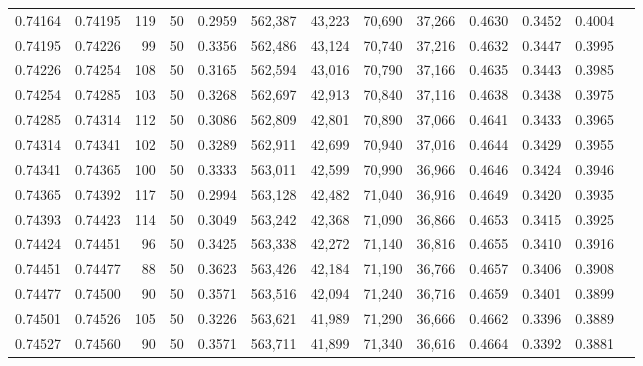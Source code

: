 \begin{tabular}{rrrrrrrrrrrrr}
0.74164 & 0.74195 &   119 &  50 &                                     0.2959 & 562,387 &  43,223 &  70,690 &  37,266 & 0.4630 & 0.3452 & 0.4004 \\
0.74195 & 0.74226 &    99 &  50 &                                     0.3356 & 562,486 &  43,124 &  70,740 &  37,216 & 0.4632 & 0.3447 & 0.3995 \\
0.74226 & 0.74254 &   108 &  50 &                                     0.3165 & 562,594 &  43,016 &  70,790 &  37,166 & 0.4635 & 0.3443 & 0.3985 \\
0.74254 & 0.74285 &   103 &  50 &                                     0.3268 & 562,697 &  42,913 &  70,840 &  37,116 & 0.4638 & 0.3438 & 0.3975 \\
0.74285 & 0.74314 &   112 &  50 &                                     0.3086 & 562,809 &  42,801 &  70,890 &  37,066 & 0.4641 & 0.3433 & 0.3965 \\
0.74314 & 0.74341 &   102 &  50 &                                     0.3289 & 562,911 &  42,699 &  70,940 &  37,016 & 0.4644 & 0.3429 & 0.3955 \\
0.74341 & 0.74365 &   100 &  50 &                                     0.3333 & 563,011 &  42,599 &  70,990 &  36,966 & 0.4646 & 0.3424 & 0.3946 \\
0.74365 & 0.74392 &   117 &  50 &                                     0.2994 & 563,128 &  42,482 &  71,040 &  36,916 & 0.4649 & 0.3420 & 0.3935 \\
0.74393 & 0.74423 &   114 &  50 &                                     0.3049 & 563,242 &  42,368 &  71,090 &  36,866 & 0.4653 & 0.3415 & 0.3925 \\
0.74424 & 0.74451 &    96 &  50 &                                     0.3425 & 563,338 &  42,272 &  71,140 &  36,816 & 0.4655 & 0.3410 & 0.3916 \\
0.74451 & 0.74477 &    88 &  50 &                                     0.3623 & 563,426 &  42,184 &  71,190 &  36,766 & 0.4657 & 0.3406 & 0.3908 \\
0.74477 & 0.74500 &    90 &  50 &                                     0.3571 & 563,516 &  42,094 &  71,240 &  36,716 & 0.4659 & 0.3401 & 0.3899 \\
0.74501 & 0.74526 &   105 &  50 &                                     0.3226 & 563,621 &  41,989 &  71,290 &  36,666 & 0.4662 & 0.3396 & 0.3889 \\
0.74527 & 0.74560 &    90 &  50 &                                     0.3571 & 563,711 &  41,899 &  71,340 &  36,616 & 0.4664 & 0.3392 & 0.3881 \\

\end{tabular}
